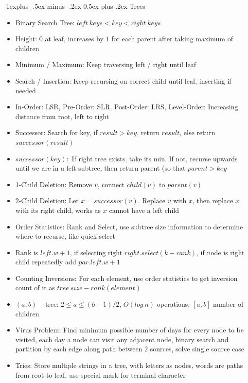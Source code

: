 \documentclass[10pt, landscape]{article}
\makeatletter
\renewcommand{\section}{\@startsection{section}{1}{0mm}%
                                {-1ex plus -.5ex minus -.2ex}%
                                {0.5ex plus .2ex}%
                                {\normalfont\large\bfseries}}
\renewcommand{\section}{\@startsection{section}{2}{0mm}%
                                {-1explus -.5ex minus -.2ex}%
                                {0.5ex plus .2ex}%
                                {\normalfont\normalsize\bfseries}}
\makeatother
\begin{document}
\begin{multicols*}{4}
\section{Trees}
\begin{itemize}
    \item Binary Search Tree: $left \ keys < key < right \ keys$
    \item Height: $0$ at leaf, increases by $1$ for each parent after taking maximum of children
    \item Minimum / Maximum: Keep traversing left / right until leaf
    \item Search / Insertion: Keep recursing on correct child until leaf, inserting if needed
    \item In-Order: LSR, Pre-Order: SLR, Post-Order: LRS, Level-Order: Increasing distance from root, left to right
    \item Successor: Search for key, if $result > key$, return $result$, else return $successor(result)$
    \item $successor(key):$ If right tree exists, take its min. If not, recurse upwards until we are in a left subtree, then return parent (so that $parent > key$
    \item 1-Child Deletion: Remove $v$, connect $child(v)$ to $parent(v)$
    \item 2-Child Deletion: Let $x = successor(v)$. Replace $v$ with $x$, then replace $x$ with its right child, works as $x$ cannot have a left child
    \item Order Statistics: Rank and Select, use subtree size information to determine where to recurse, like quick select
    \item Rank is $left.w+1$, if selecting right $right.select(k-rank)$, if node is right child repeatedly add $par.left.w+1$
    \item Counting Inversions: For each element, use order statistics to get inversion count of it as $tree\ size - rank(element)$
    \item $(a,b)-$tree: $2\leq a\leq (b+1)/2$, $O(log \ n)$ operations, $[a, b]$ number of children
    \item Virus Problem: Find minimum possible number of days for every node to be visited, each day a node can visit any adjacent node, binary search and partition by each edge along path between 2 sources, solve single source case
    \item Tries: Store multiple strings in a tree, with letters as nodes, words are paths from root to leaf, use special mark for terminal character
\end{itemize}


\end{multicols*}
\end{document}
